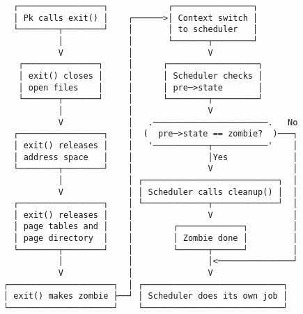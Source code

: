 \documentclass[varwidth=40em,crop]{standalone}
\begin{document}
\begin{verbatim}
  ┌─────────────────┐            ┌────────────────┐
  │ Pk calls exit() │    ┌──────>│ Context switch │
  └────────┬────────┘    │       │ to scheduler   │
           │             │       └───────┬────────┘
           V             │               V                 
   ┌───────────────┐     │      ┌──────────────────┐       
   │ exit() closes │     │      │ Scheduler checks │       
   │ open files    │     │      │ pre─>state       │       
   └───────┬───────┘     │      └────────┬─────────┘       
           │             │               V                 
           V             │   .───────────────────────.   No
  ┌─────────────────┐    │  (  pre─>state == zombie?  )───┐
  │ exit() releases │    │   '───────────┬───────────'    │
  │ address space   │    │               │Yes             │
  └────────┬────────┘    │               V                │
           │             │ ┌───────────────────────────┐  │
           V             │ │ Scheduler calls cleanup() │  │
  ┌─────────────────┐    │ └─────────────┬─────────────┘  │
  │ exit() releases │    │               V                │
  │ page tables and │    │        ┌─────────────┐         │
  │ page directory  │    │        │ Zombie done │         │
  └────────┬────────┘    │        └──────┬──────┘         │
           │             │               │<───────────────┘
           V             │               V                 
┌─────────────────────┐  │ ┌────────────────────────────┐  
│ exit() makes zombie ├──┘ │ Scheduler does its own job │  
└─────────────────────┘    └────────────────────────────┘  
\end{verbatim}
\end{document}
